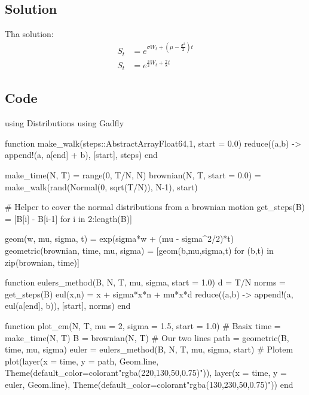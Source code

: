 \documentclass[a4paper,12pt]{article}
\begin{document}
\section{}

\subsection*{Solution}

Tha solution:
%
\begin{align*}
S_t &= e^{\sigma W_t + (\mu - \frac{\sigma^2}{2})t} \\
S_t &= e^{\frac{3}{2}W_t + \frac{7}{8}t}
\end{align*}

\subsection*{Code}
\begin{juliacode}
using Distributions
using Gadfly

function make_walk(steps::AbstractArray{Float64,1}, start = 0.0)
    reduce((a,b) -> append!(a, a[end] + b), [start], steps)
end

make_time(N, T) = range(0, T/N, N)
brownian(N, T, start = 0.0) = make_walk(rand(Normal(0, sqrt(T/N)), N-1), start)

# Helper to cover the normal distributions from a brownian motion
get_steps(B) = [B[i] - B[i-1] for i in 2:length(B)]

geom(w, mu, sigma, t) = exp(sigma*w + (mu - sigma^2/2)*t)
geometric(brownian, time, mu, sigma) = [geom(b,mu,sigma,t) for (b,t) in zip(brownian, time)]

function eulers_method(B, N, T, mu, sigma, start = 1.0)
    d = T/N
    norms = get_steps(B)
    eul(x,n) = x + sigma*x*n + mu*x*d
    reduce((a,b) -> append!(a, eul(a[end], b)), [start], norms)
end

function plot_em(N, T, mu = 2, sigma = 1.5, start = 1.0)
    # Basix
    time = make_time(N, T)
    B = brownian(N, T)
    # Our two lines
    path = geometric(B, time, mu, sigma)
    euler = eulers_method(B, N, T, mu, sigma, start)
    # Plotem
    plot(layer(x = time, y = path, Geom.line,
               Theme(default_color=colorant"rgba(220,130,50,0.75)")),   
         layer(x = time, y = euler, Geom.line),
         Theme(default_color=colorant"rgba(130,230,50,0.75)"))
end
\end{juliacode}
\end{document}
